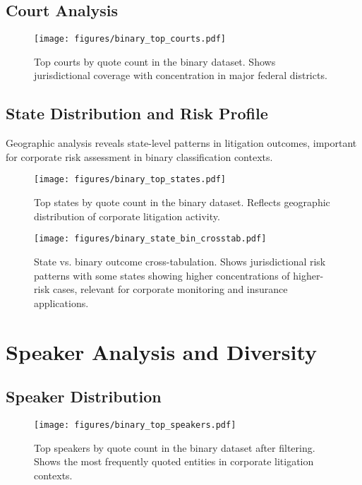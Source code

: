 \documentclass[11pt,a4paper]{article}
\begin{document}
\subsection{Court Analysis}

\begin{figure}[H]
\centering
\texttt{[image: figures/binary\_top\_courts.pdf]}
\caption{Top courts by quote count in the binary dataset. Shows jurisdictional coverage with concentration in major federal districts.}
\end{figure}

\subsection{State Distribution and Risk Profile}

Geographic analysis reveals state-level patterns in litigation outcomes, important for corporate risk assessment in binary classification contexts.

\begin{figure}[H]
\centering
\texttt{[image: figures/binary\_top\_states.pdf]}
\caption{Top states by quote count in the binary dataset. Reflects geographic distribution of corporate litigation activity.}
\end{figure}

\begin{figure}[H]
\centering
\texttt{[image: figures/binary\_state\_bin\_crosstab.pdf]}
\caption{State vs. binary outcome cross-tabulation. Shows jurisdictional risk patterns with some states showing higher concentrations of higher-risk cases, relevant for corporate monitoring and insurance applications.}
\end{figure}

\section{Speaker Analysis and Diversity}

\subsection{Speaker Distribution}

\begin{figure}[H]
\centering
\texttt{[image: figures/binary\_top\_speakers.pdf]}
\caption{Top speakers by quote count in the binary dataset after filtering. Shows the most frequently quoted entities in corporate litigation contexts.}
\end{figure}
\end{document}
